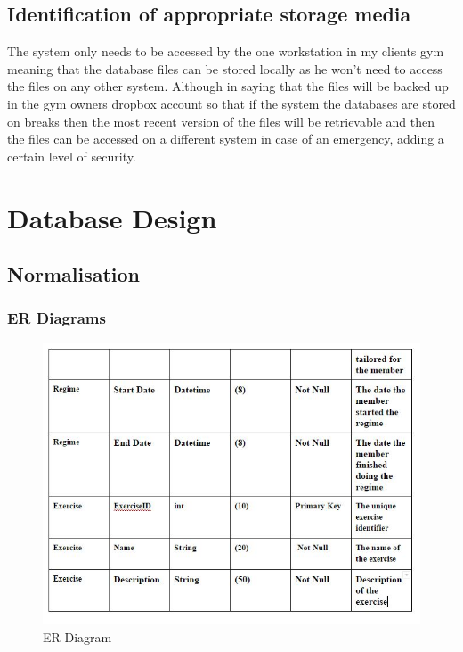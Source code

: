 \begin{itemize}
\subsection{Identification of appropriate storage media}

The system only needs to be accessed by the one workstation in my clients gym meaning that the database files can be stored locally as he won't need to access the files on any other system. Although in saying that the files will be backed up in the gym owners dropbox account so that if the system the databases are stored on breaks then the most recent version of the files will be retrievable and then the files can be accessed on a different system in case of an emergency, adding a certain level of security. 

\section{Database Design}

\subsection{Normalisation}

\subsubsection{ER Diagrams}

\begin{figure}[H]
    \includegraphics[width=\textwidth]{NewDict3.JPG}
    \caption{ER Diagram} \label{fig: ER Diagram}
\end{figure}


\end{itemize}
